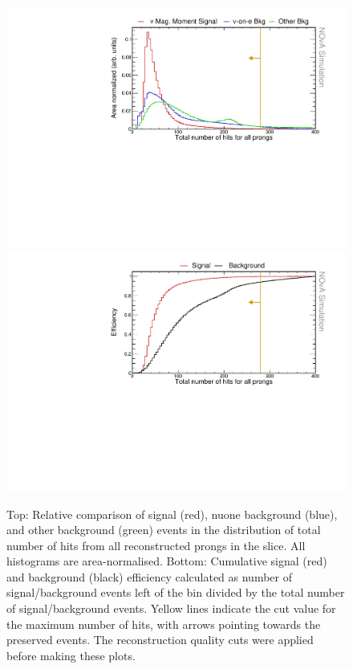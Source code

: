 \begin{figure}[hbtp]
\centering
\includegraphics[width=.9\textwidth]{Plots/NuMMEventSelection/N1Cut_NHitsLoose.pdf}
\includegraphics[width=.9\textwidth]{Plots/NuMMEventSelection/NuMM_N1Cut_NHitsLooseleft_Eff.pdf}
\caption[Number of hits cut for pre-selection]{Top: Relative comparison of signal (red), \acrshort{nuone} background (blue), and other background (green) events in the distribution of total number of hits from all reconstructed prongs in the slice. All histograms are area-normalised. Bottom: Cumulative signal (red) and background (black) efficiency calculated as number of signal/background events left of the bin divided by the total number of signal/background events. Yellow lines indicate the cut value for the maximum number of hits, with arrows pointing towards the preserved events. The reconstruction quality cuts were applied before making these plots.}
\label{fig:NuMMCutsNHitsLoose}
\end{figure}

